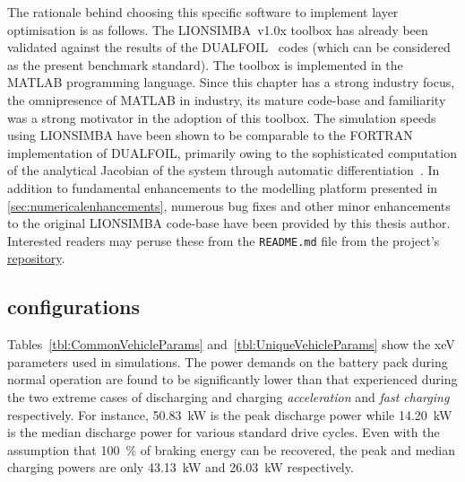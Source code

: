 The  rationale  behind  choosing  this  specific  software  to  implement  layer
optimisation  is  as  follows.  The LIONSIMBA~v1.0x  toolbox  has  already  been
validated against  the results of the  DUALFOIL~\cite{Dualfoil1998} codes (which
can be considered as the present benchmark standard). The toolbox is implemented
in the  MATLAB programming language.  Since this  chapter has a  strong industry
focus,  the  omnipresence  of  MATLAB  in industry,  its  mature  code-base  and
familiarity  was  a strong  motivator  in  the  adoption  of this  toolbox.  The
simulation  speeds using  LIONSIMBA  have been  shown to  be  comparable to  the
FORTRAN  implementation  of  DUALFOIL,  primarily  owing  to  the  sophisticated
computation  of  the  analytical  Jacobian   of  the  system  through  automatic
differentiation~\cite{Torchio2016}.  In  addition  to  fundamental  enhancements
to  the   modelling  platform  presented   in  \cref{sec:numericalenhancements},
numerous  bug fixes  and  other  minor enhancements  to  the original  LIONSIMBA
code-base  have  been  provided  by   this  thesis  author.  Interested  readers
may  peruse   these  from  the   \texttt{README.md}  file  from   the  project's
\href{https://github.com/lionsimbatoolbox/LIONSIMBA}{repository}.

\subsection{ configurations}



Tables~\ref{tbl:CommonVehicleParams} and~\ref{tbl:UniqueVehicleParams}  show the
\gls{xeV}  parameters used  in simulations.  The  power demands  on the  battery
pack  during  normal  operation  are   found  to  be  significantly  lower  than
that  experienced during  the  two  extreme cases  of  discharging and  charging
\viz{} \emph{acceleration} and \emph{fast  charging} respectively. For instance,
\SI{50.83}{\kilo\watt} is the peak  discharge power while \SI{14.20}{\kilo\watt}
is  the median  discharge power  for various  standard drive  cycles. Even  with
the  assumption that  \SI{100}{\percent}  of braking  energy  can be  recovered,
the  peak  and  median  charging  powers  are  only  \SI{43.13}{\kilo\watt}  and
\SI{26.03}{\kilo\watt}  respectively.

